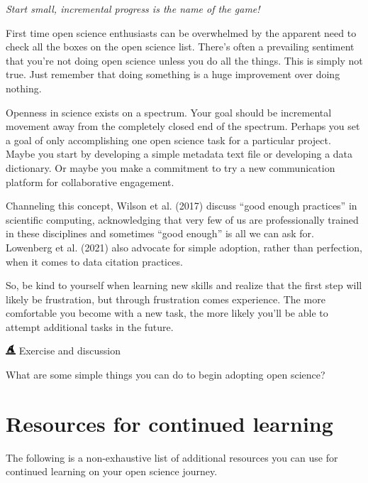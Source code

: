 \documentclass[
  letterpaper,
  DIV=11,
  numbers=noendperiod]{scrreprt}
\begin{document}
\emph{Start small, incremental progress is the name of the game!}

First time open science enthusiasts can be overwhelmed by the apparent
need to check all the boxes on the open science list. There's often a
prevailing sentiment that you're not doing open science unless you do
all the things. This is simply not true. Just remember that doing
something is a huge improvement over doing nothing.

Openness in science exists on a spectrum. Your goal should be
incremental movement away from the completely closed end of the
spectrum. Perhaps you set a goal of only accomplishing one open science
task for a particular project. Maybe you start by developing a simple
metadata text file or developing a data dictionary. Or maybe you make a
commitment to try a new communication platform for collaborative
engagement.

Channeling this concept, Wilson et al. (2017) discuss ``good enough
practices'' in scientific computing, acknowledging that very few of us
are professionally trained in these disciplines and sometimes ``good
enough'' is all we can ask for. Lowenberg et al. (2021) also advocate
for simple adoption, rather than perfection, when it comes to data
citation practices.

So, be kind to yourself when learning new skills and realize that the
first step will likely be frustration, but through frustration comes
experience. The more comfortable you become with a new task, the more
likely you'll be able to attempt additional tasks in the future.

\includegraphics[width=1em,height=1em]{./implement_files/figure-pdf/fa-icon-20d474448f872ee43905e611a2502347.pdf}
Exercise and discussion

What are some simple things you can do to begin adopting open science?


\hypertarget{resources-for-continued-learning}{%
\chapter*{Resources for continued
learning}\label{resources-for-continued-learning}}

The following is a non-exhaustive list of additional resources you can
use for continued learning on your open science journey.
\end{document}
